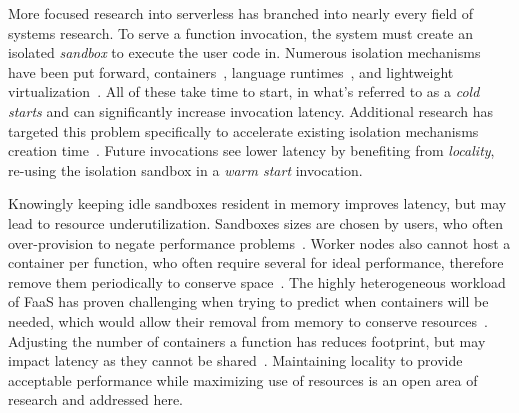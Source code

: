 More focused research into serverless has branched into nearly every field of systems research.
To serve a function invocation, the system must create an isolated \emph{sandbox} to execute the user code in.
Numerous isolation mechanisms have been put forward, containers~\cite{chhatrapati2021towards,docker-main,gvisor}, language runtimes~\cite{shillaker2020faasm,aytekin2019harnessing}, and lightweight virtualization~\cite{firecracker-nsdi20}.
All of these take time to start, in what's referred to as a \textit{cold starts} and can significantly increase invocation latency.
Additional research has targeted this problem specifically to accelerate existing isolation mechanisms creation time~\cite{mohan2019agile,du2020catalyzer,warm2}.
Future invocations see lower latency by benefiting from \emph{locality}, re-using the isolation sandbox in a \textit{warm start} invocation.

Knowingly keeping idle sandboxes resident in memory improves latency, but may lead to resource underutilization.
Sandboxes sizes are chosen by users, who often over-provision to negate performance problems~\cite{mvondo2021ofc,romero2021faa,eismann2021sizeless,yu2021harvesting,serverless-harvest-sosp21}.
Worker nodes also cannot host a container per function, who often require several for ideal performance, therefore remove them periodically to conserve space~\cite{faascache-asplos21}.
The highly heterogeneous workload of FaaS has proven challenging when trying to predict when containers will be needed, which would allow their removal from memory to conserve resources~\cite{shahrad2020serverless,zhao2021understanding}.
Adjusting the number of containers a function has reduces footprint, but may impact latency as they cannot be shared~\cite{enes2020real,li2022kneescale}.
Maintaining locality to provide acceptable performance while maximizing use of resources is an open area of research and addressed here.


